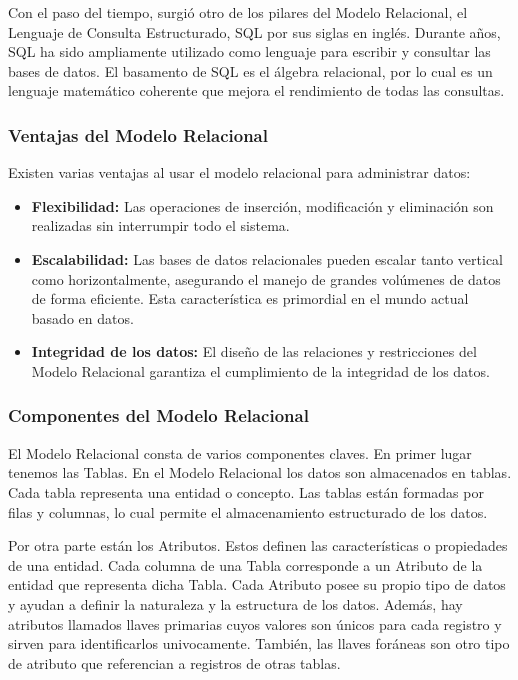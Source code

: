 Con el paso del tiempo, surgió otro de los pilares del Modelo Relacional, el Lenguaje de Consulta Estructurado, SQL por 
sus siglas en ingl\'es. Durante años, SQL ha sido ampliamente utilizado como lenguaje para escribir y consultar las bases 
de datos. El basamento de SQL es el \'algebra relacional, por lo cual es un lenguaje matemático coherente que mejora el 
rendimiento de todas las consultas.


\subsubsection{Ventajas del Modelo Relacional}

Existen varias ventajas al usar el modelo relacional para administrar datos:

\begin{itemize}
    \item \textbf{Flexibilidad:} Las operaciones de inserción, modificación y eliminaci\'on son realizadas sin interrumpir
        todo el sistema. 
    
    \item \textbf{Escalabilidad:} Las bases de datos relacionales pueden escalar tanto vertical como horizontalmente, 
        asegurando el manejo de grandes volúmenes de datos de forma eficiente. Esta característica es primordial en el 
        mundo actual basado en datos.

    \item \textbf{Integridad de los datos:} El diseño de las relaciones y restricciones del Modelo Relacional garantiza 
        el cumplimiento de la integridad de los datos. 
\end{itemize}


\subsubsection{Componentes del Modelo Relacional}

El Modelo Relacional consta de varios componentes claves. En primer lugar tenemos las Tablas. En el Modelo Relacional 
los datos son almacenados en tablas. Cada tabla representa una entidad o concepto. Las tablas est\'an formadas por filas 
y columnas, lo cual permite el almacenamiento estructurado de los datos.

Por otra parte est\'an los Atributos. Estos definen las características o propiedades de una entidad. Cada columna de una 
Tabla corresponde a un Atributo de la entidad que representa dicha Tabla. Cada Atributo posee su propio tipo de datos y 
ayudan a definir la naturaleza y la estructura de los datos. Además, hay atributos llamados llaves primarias cuyos 
valores son \'unicos para cada registro y sirven para identificarlos univocamente. También, las llaves for\'aneas son 
otro tipo de atributo que referencian a registros de otras tablas.

